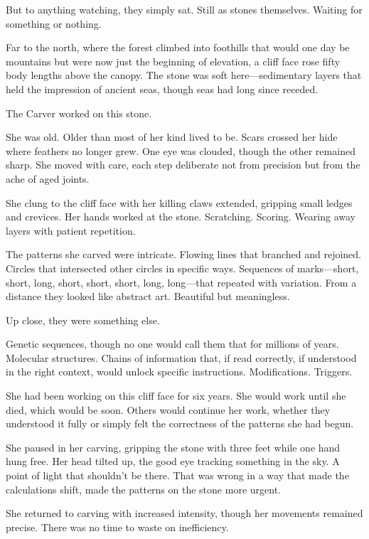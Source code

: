 But to anything watching, they simply sat. Still as stones themselves. Waiting for something or nothing.

\scenebreak

Far to the north, where the forest climbed into foothills that would one day be mountains but were now just the beginning of elevation, a cliff face rose fifty body lengths above the canopy. The stone was soft here—sedimentary layers that held the impression of ancient seas, though seas had long since receded.

The Carver worked on this stone.

She was old. Older than most of her kind lived to be. Scars crossed her hide where feathers no longer grew. One eye was clouded, though the other remained sharp. She moved with care, each step deliberate not from precision but from the ache of aged joints.

She clung to the cliff face with her killing claws extended, gripping small ledges and crevices. Her hands worked at the stone. Scratching. Scoring. Wearing away layers with patient repetition.

The patterns she carved were intricate. Flowing lines that branched and rejoined. Circles that intersected other circles in specific ways. Sequences of marks—short, short, long, short, short, short, long, long—that repeated with variation. From a distance they looked like abstract art. Beautiful but meaningless.

Up close, they were something else.

Genetic sequences, though no one would call them that for millions of years. Molecular structures. Chains of information that, if read correctly, if understood in the right context, would unlock specific instructions. Modifications. Triggers.

She had been working on this cliff face for six years. She would work until she died, which would be soon. Others would continue her work, whether they understood it fully or simply felt the correctness of the patterns she had begun.

She paused in her carving, gripping the stone with three feet while one hand hung free. Her head tilted up, the good eye tracking something in the sky. A point of light that shouldn't be there. That was wrong in a way that made the calculations shift, made the patterns on the stone more urgent.

She returned to carving with increased intensity, though her movements remained precise. There was no time to waste on inefficiency.

